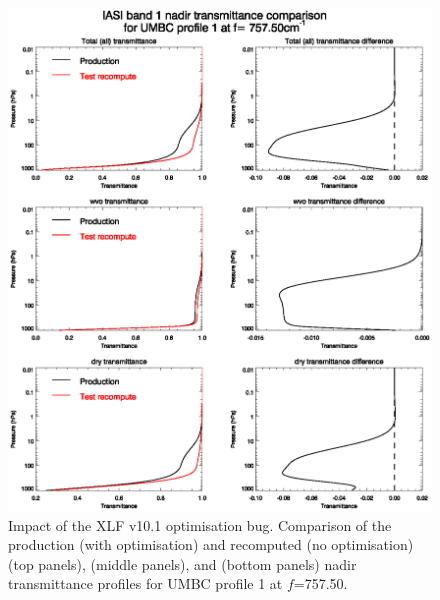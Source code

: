\begin{figure}[htp]
  \centering
  \includegraphics[scale=0.8]{graphics/tau_comparison_757.50cm-1.eps}
  \caption{Impact of the XLF v10.1 optimisation bug. Comparison of the production (with optimisation) and recomputed (no optimisation)  (top panels),  (middle panels), and  (bottom panels) nadir  transmittance profiles for UMBC profile 1 at $f$=757.50\invcm{}.}
  \label{fig:tau_comparison_757.50cm-1}
\end{figure}
